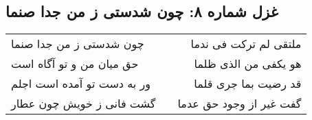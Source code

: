 \begin{center}
\section*{غزل شماره ۸: چون شدستی ز من جدا صنما}
\label{sec:008}
\begin{longtable}{l p{0.5cm} r}
چون شدستی ز من جدا صنما
&&
ملتقی لم ترکت فی ندما
\\
حق میان من و تو آگاه است
&&
هو یکفی من الذی ظلما
\\
ور به دست تو آمده است اجلم
&&
قد رضیت بما جری قلما
\\
گشت فانی ز خویش چون عطار
&&
گفت غیر از وجود حق عدما
\\
\end{longtable}
\end{center}
